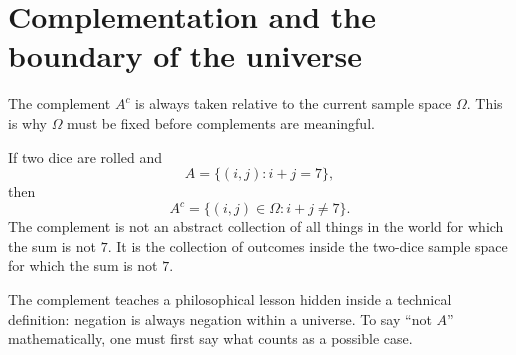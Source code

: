 \section{Complementation and the boundary of the universe}

The complement \(A^c\) is always taken relative to the current sample space \(\Omega\). This is why \(\Omega\) must be fixed before complements are meaningful.

\begin{examplebox}
If two dice are rolled and
\[
A=\{(i,j):i+j=7\},
\]
then
\[
A^c=\{(i,j)\in\Omega:i+j\neq 7\}.
\]
The complement is not an abstract collection of all things in the world for which the sum is not \(7\). It is the collection of outcomes inside the two-dice sample space for which the sum is not \(7\).
\end{examplebox}

The complement teaches a philosophical lesson hidden inside a technical definition: negation is always negation within a universe. To say ``not \(A\)'' mathematically, one must first say what counts as a possible case.
